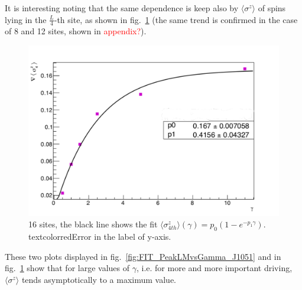 It is interesting noting that the same dependence is keep also by $\langle\sigma^z\rangle$ of spins lying in the $\frac{L}{4}$-th site, as shown in fig.~\ref{fig:FIT_16sites_4thSiteVSgamma} (the same trend is confirmed in the case of 8 and 12 sites, shown in \textcolor{red}{appendix?}).

\begin{figure}[H]
    \centering
    \includegraphics[scale=0.7]{Figures/16sites/FIT_16sites_4thSiteVSgamma.pdf}
    \captionsetup{width=1.\linewidth}
    \caption{16 sites, the black line shows the fit $\langle\sigma^z_{4th}\rangle(\gamma) = p_0(1-e^{-p_1\gamma})$. 
    \\textcolor{red}{Error in the label of y-axis.}}
    \label{fig:FIT_16sites_4thSiteVSgamma}
\end{figure}

These two plots displayed in fig.~\ref{fig:FIT_PeakLMvsGamma_J1051} and in fig.~\ref{fig:FIT_16sites_4thSiteVSgamma} show that for large values of $\gamma$, i.e. for more and more important driving, $\langle\sigma^z\rangle$ tends asymptotically to a maximum value.




